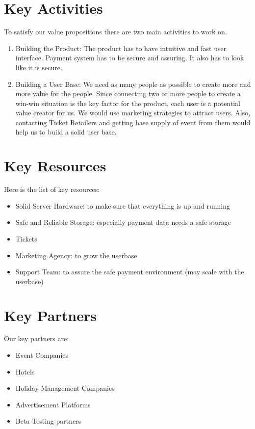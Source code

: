 \documentclass{article}
\begin{document}
\vspace{-3mm}
\section{Key Activities}

To satisfy our value propositions there are two main activities to work on.
\begin{enumerate}
    \item Building the Product: The product has to have intuitive and fast user interface. Payment system has to be secure and assuring. It also has to look like it is secure.
    
    \item Building a User Base: We need as many people as possible to create more and more value for the people. Since connecting two or more people to create a win-win situation is the key factor for the product, each user is a potential value creator for us. We would use marketing strategies to attract users. Also, contacting Ticket Retailers and getting base supply of event from them would help us to build a solid user base. 
    
\end{enumerate}

\vspace{-3mm}
\section{Key Resources}

Here is the list of key resources:
\begin{itemize}
    \item Solid Server Hardware: to make sure that everything is up and running
    \item Safe and Reliable Storage: especially payment data needs a safe storage
    \item Tickets
    \item Marketing Agency: to grow the userbase
    \item Support Team: to assure the safe payment environment (may scale with the userbase)
\end{itemize}

\vspace{-3mm}
\newpage
\section{Key Partners}
Our key partners are:
\begin{multicols}{2}
    \begin{itemize}
        \item Event Companies
        \item Hotels
        \item Holiday Management Companies
        \item Advertisement Platforms
        \item Beta Testing partners
    \end{itemize}
\end{multicols}
\end{document}
